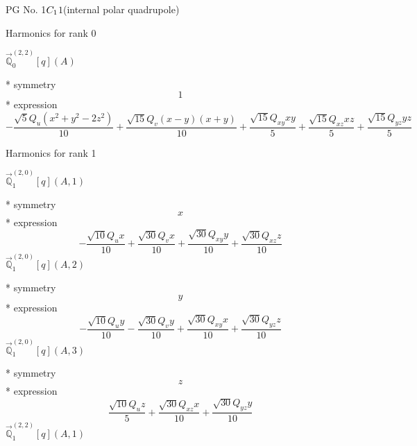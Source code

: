 \documentclass[fleqn,8pt]{jsarticle}
\begin{document}
\setcounter{MaxMatrixCols}{32}

\renewcommand{\tablename}{Table~}
\renewcommand{\figurename}{Figure~}
\begin{center}
\LARGE
PG No. 1\quad$C_{\rm 1}$\quad$1$\quad[ triclinic ] (internal polar quadrupole)
\end{center}

\noindent * Harmonics for rank 0

\noindent\quad $\vec{\mathbb{Q}}_{0}^{(2,2)}[q](A)$

\noindent\quad ** symmetry
\begin{dmath*}
1
\end{dmath*}
\noindent\quad ** expression
\begin{dmath*}
- \frac{\sqrt{5} Q_{u} \left(x^{2} + y^{2} - 2 z^{2}\right)}{10} + \frac{\sqrt{15} Q_{v} \left(x - y\right) \left(x + y\right)}{10} + \frac{\sqrt{15} Q_{xy} x y}{5} + \frac{\sqrt{15} Q_{xz} x z}{5} + \frac{\sqrt{15} Q_{yz} y z}{5}
\end{dmath*}

\noindent * Harmonics for rank 1

\noindent\quad $\vec{\mathbb{Q}}_{1}^{(2,0)}[q](A,1)$

\noindent\quad ** symmetry
\begin{dmath*}
x
\end{dmath*}
\noindent\quad ** expression
\begin{dmath*}
- \frac{\sqrt{10} Q_{u} x}{10} + \frac{\sqrt{30} Q_{v} x}{10} + \frac{\sqrt{30} Q_{xy} y}{10} + \frac{\sqrt{30} Q_{xz} z}{10}
\end{dmath*}
\noindent\quad $\vec{\mathbb{Q}}_{1}^{(2,0)}[q](A,2)$

\noindent\quad ** symmetry
\begin{dmath*}
y
\end{dmath*}
\noindent\quad ** expression
\begin{dmath*}
- \frac{\sqrt{10} Q_{u} y}{10} - \frac{\sqrt{30} Q_{v} y}{10} + \frac{\sqrt{30} Q_{xy} x}{10} + \frac{\sqrt{30} Q_{yz} z}{10}
\end{dmath*}
\noindent\quad $\vec{\mathbb{Q}}_{1}^{(2,0)}[q](A,3)$

\noindent\quad ** symmetry
\begin{dmath*}
z
\end{dmath*}
\noindent\quad ** expression
\begin{dmath*}
\frac{\sqrt{10} Q_{u} z}{5} + \frac{\sqrt{30} Q_{xz} x}{10} + \frac{\sqrt{30} Q_{yz} y}{10}
\end{dmath*}
\noindent\quad $\vec{\mathbb{Q}}_{1}^{(2,2)}[q](A,1)$
\end{document}
